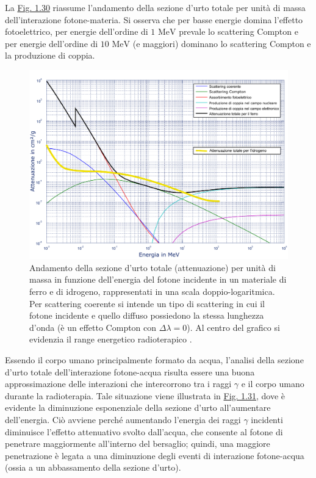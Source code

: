 \documentclass[12pt,a4paper,twoside]{report}
\begin{document}
	La \hyperref[fig:attenuation]{Fig. 1.30} riassume l'andamento della sezione d'urto totale per unità di massa dell'interazione fotone-materia. Si osserva che per basse energie domina l'effetto fotoelettrico, per energie dell'ordine di $1\mbox{ MeV}$ prevale lo scattering Compton e per energie dell'ordine di $10\mbox{ MeV}$ (e maggiori) dominano lo scattering Compton e la produzione di coppia.
	\begin{figure}[H]
		\centering
		\includegraphics[width=0.9\linewidth]{attenuation.pdf}
		\caption{Andamento della sezione d'urto totale (attenuazione) per unità di massa in funzione dell'energia del fotone incidente in un materiale di ferro e di idrogeno, rappresentati in una scala doppio-logaritmica. Per scattering coerente si intende un tipo di scattering in cui il fotone incidente e quello diffuso possiedono la stessa lunghezza d'onda (è un effetto Compton con $\Delta \lambda=0$). Al centro del grafico si evidenzia il range energetico radioterapico \cite{attenCoeff,Marghany2021-xg}.}
		\label{fig:attenuation}
	\end{figure}
	Essendo il corpo umano principalmente formato da acqua, l'analisi della sezione d'urto totale dell'interazione fotone-acqua risulta essere una buona approssimazione delle interazioni che intercorrono tra i raggi $\gamma$ e il corpo umano durante la radioterapia. Tale situazione viene illustrata in \hyperref[fig:attenuation_water]{Fig. 1.31}, dove è evidente la diminuzione esponenziale della sezione d'urto all'aumentare dell'energia. Ciò avviene perché aumentando l'energia dei raggi $\gamma$ incidenti diminuisce l'effetto attenuativo svolto dall'acqua, che consente al fotone di penetrare maggiormente all'interno del bersaglio; quindi, una maggiore penetrazione è legata a una diminuzione degli eventi di interazione fotone-acqua (ossia a un abbassamento della sezione d'urto).
\end{document}
